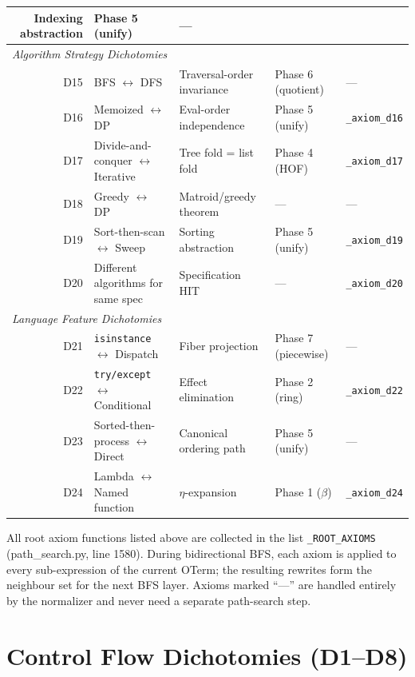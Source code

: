 \begin{longtable}{r p{3.5cm} p{3.5cm} p{3.0cm} p{2.2cm}}
    Indexing abstraction &
    Phase 5 (unify) &
    --- \\
  \midrule
  \multicolumn{5}{l}{\emph{Algorithm Strategy Dichotomies}} \\
  \midrule
  D15 & BFS $\leftrightarrow$ DFS &
    Traversal-order invariance &
    Phase 6 (quotient) &
    --- \\
  D16 & Memoized $\leftrightarrow$ DP &
    Eval-order independence &
    Phase 5 (unify) &
    \texttt{\_axiom\_d16} \\
  D17 & Divide-and-conquer $\leftrightarrow$ Iterative &
    Tree fold = list fold &
    Phase 4 (HOF) &
    \texttt{\_axiom\_d17} \\
  D18 & Greedy $\leftrightarrow$ DP &
    Matroid/greedy theorem &
    --- &
    --- \\
  D19 & Sort-then-scan $\leftrightarrow$ Sweep &
    Sorting abstraction &
    Phase 5 (unify) &
    \texttt{\_axiom\_d19} \\
  D20 & Different algorithms for same spec &
    Specification HIT &
    --- &
    \texttt{\_axiom\_d20} \\
  \midrule
  \multicolumn{5}{l}{\emph{Language Feature Dichotomies}} \\
  \midrule
  D21 & \texttt{isinstance} $\leftrightarrow$ Dispatch &
    Fiber projection &
    Phase 7 (piecewise) &
    --- \\
  D22 & \texttt{try/except} $\leftrightarrow$ Conditional &
    Effect elimination &
    Phase 2 (ring) &
    \texttt{\_axiom\_d22} \\
  D23 & Sorted-then-process $\leftrightarrow$ Direct &
    Canonical ordering path &
    Phase 5 (unify) &
    --- \\
  D24 & Lambda $\leftrightarrow$ Named function &
    $\eta$-expansion &
    Phase 1 ($\beta$) &
    \texttt{\_axiom\_d24} \\
  \bottomrule
\end{longtable}

\begin{remark}
All root axiom functions listed above are collected in the list
\texttt{\_ROOT\_AXIOMS} (path\_search.py, line 1580).
During bidirectional BFS, each axiom is applied to every sub-expression
of the current OTerm; the resulting rewrites form the neighbour set
for the next BFS layer.  Axioms marked ``---'' are handled entirely
by the normalizer and never need a separate path-search step.
\end{remark}


\chapter{Control Flow Dichotomies (D1--D8)}
\label{ch:cf-dichotomies}


